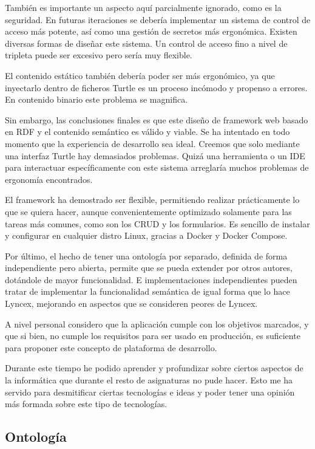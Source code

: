 \documentclass[12pt]{report} %
\begin{document}
También es importante un aspecto aquí parcialmente ignorado, como es la seguridad. En futuras iteraciones se debería implementar un sistema de control de acceso más potente, así como una gestión de secretos más ergonómica. Existen diversas formas de diseñar este sistema. Un control de acceso fino a nivel de tripleta puede ser excesivo pero sería muy flexible.

El contenido estático también debería poder ser más ergonómico, ya que inyectarlo dentro de ficheros Turtle es un proceso incómodo y propenso a errores. En contenido binario este problema se magnifica.

Sin embargo, las conclusiones finales es que este diseño de framework web basado en RDF y el contenido semántico es válido y viable. Se ha intentado en todo momento que la experiencia de desarrollo sea ideal. Creemos que solo mediante una interfaz Turtle hay demasiados problemas. Quizá una herramienta o un IDE para interactuar específicamente con este sistema arreglaría muchos problemas de ergonomía encontrados.

El framework ha demostrado ser flexible, permitiendo realizar prácticamente lo que se quiera hacer, aunque convenientemente optimizado solamente para las tareas más comunes, como son los CRUD y los formularios. Es sencillo de instalar y configurar en cualquier distro Linux, gracias a Docker y Docker Compose.

Por último, el hecho de tener una ontología por separado, definida de forma independiente pero abierta, permite que se pueda extender por otros autores, dotándole de mayor funcionalidad. E implementaciones independientes pueden tratar de implementar la funcionalidad semántica de igual forma que lo hace Lyncex, mejorando en aspectos que se consideren peores de Lyncex.

A nivel personal considero que la aplicación cumple con los objetivos marcados, y que si bien, no cumple los requisitos para ser usado en producción, es suficiente para proponer este concepto de plataforma de desarrollo.

Durante este tiempo he podido aprender y profundizar sobre ciertos aspectos de la informática que durante el resto de asignaturas no pude hacer. Esto me ha servido para desmitificar ciertas tecnologías e ideas y poder tener una opinión más formada sobre este tipo de tecnologías.


\begin{appendices}
\chapter{Ontología}

\end{appendices}



\end{document}
